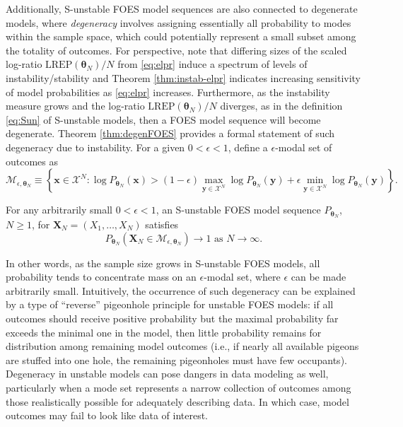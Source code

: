 \documentclass[12pt]{article}
\theoremstyle{definition}
\newcommand{\REP}{\mathrm{LREP}}
\let\BeginKnitrBlock\begin \let\EndKnitrBlock\end
\begin{document}
Additionally, S-unstable FOES model sequences are also connected to
degenerate models, where \emph{degeneracy} involves assigning
essentially all probability to modes within the sample space, which
could potentially represent a small subset among the totality of
outcomes. For perspective, note that differing sizes of the scaled
log-ratio \(\REP(\boldsymbol \theta_N)/N\) from \eqref{eq:elpr} induce a
spectrum of levels of instability/stability and Theorem
\ref{thm:instab-elpr} indicates increasing sensitivity of model
probabilities as \eqref{eq:elpr} increases. Furthermore, as the
instability measure grows and the log-ratio
\(\REP(\boldsymbol \theta_N)/N\) diverges, as in the definition
\eqref{eq:Sun} of S-unstable models, then a FOES model sequence will
become degenerate. Theorem \ref{thm:degenFOES} provides a formal
statement of such degeneracy due to instability. For a given
\(0 < \epsilon < 1\), define a \(\epsilon\)-modal set of outcomes as
\begin{equation}
\label{eq:mode}
\mathcal{M}_{\epsilon, \boldsymbol \theta_N} \equiv \left\{\boldsymbol x \in \mathcal{X}^N: \log P_{\boldsymbol \theta_N}(\boldsymbol x) > (1-\epsilon)\max\limits_{\boldsymbol y \in \mathcal{X}^N} \log  P_{\boldsymbol \theta_N}(\boldsymbol y) + \epsilon\min\limits_{\boldsymbol y \in \mathcal{X}^N} \log P_{\boldsymbol \theta_N}(\boldsymbol y) \right\}.
\end{equation}
\BeginKnitrBlock{theorem}
\protect\hypertarget{thm:degenFOES}{}{\label{thm:degenFOES}}For any
arbitrarily small \(0 < \epsilon < 1\), an S-unstable FOES model
sequence \(P_{\boldsymbol \theta_N}\), \(N \geq 1\), for
\(\boldsymbol X_N=(X_1, \dots, X_N)\) satisfies \[
P_{\boldsymbol \theta_N}\left( \boldsymbol X_N\in \mathcal{M}_{\epsilon, \boldsymbol \theta_N}\right) \rightarrow 1 \text{ as } N \rightarrow \infty.
\]
\EndKnitrBlock{theorem}

In other words, as the sample size grows in S-unstable FOES models, all
probability tends to concentrate mass on an \(\epsilon\)-modal set,
where \(\epsilon\) can be made arbitrarily small. Intuitively, the
occurrence of such degeneracy can be explained by a type of ``reverse''
pigeonhole principle for unstable FOES models: if all outcomes should
receive positive probability but the maximal probability far exceeds the
minimal one in the model, then little probability remains for
distribution among remaining model outcomes (i.e., if nearly all
available pigeons are stuffed into one hole, the remaining pigeonholes
must have few occupants). Degeneracy in unstable models can pose dangers
in data modeling as well, particularly when a mode set represents a
narrow collection of outcomes among those realistically possible for
adequately describing data. In which case, model outcomes may fail to
look like data of interest.
\end{document}
